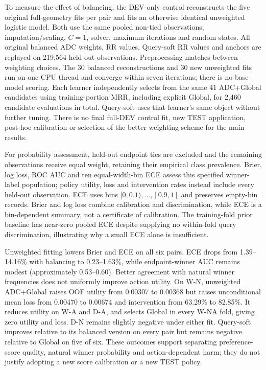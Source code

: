 \documentclass[11pt,a4paper]{article}
\begin{document}
To measure the effect of balancing, the DEV-only control reconstructs the five original full-geometry fits per pair and fits an otherwise identical unweighted logistic model. Both use the same pooled non-tied observations, imputation/scaling, $C=1$, solver, maximum iterations and random states. All original balanced ADC weights, RR values, Query-soft RR values and anchors are replayed on 219,564 held-out observations. Preprocessing matches between weighting choices. The 30 balanced reconstructions and 30 new unweighted fits run on one CPU thread and converge within seven iterations; there is no base-model scoring. Each learner independently selects from the same 41 ADC+Global candidates using training-portion MRR, including explicit Global, for 2,460 candidate evaluations in total. Query-soft uses that learner's same object without further tuning. There is no final full-DEV control fit, new TEST application, post-hoc calibration or selection of the better weighting scheme for the main results.



For probability assessment, held-out endpoint ties are excluded and the remaining observations receive equal weight, retaining their empirical class prevalence. Brier, log loss, ROC AUC and ten equal-width-bin ECE assess this specified winner-label population; policy utility, loss and intervention rates instead include every held-out observation. ECE uses bins $[0,0.1),\ldots,[0.9,1]$ and preserves empty-bin records. Brier and log loss combine calibration and discrimination, while ECE is a bin-dependent summary, not a certificate of calibration. The training-fold prior baseline has near-zero pooled ECE despite supplying no within-fold query discrimination, illustrating why a small ECE alone is insufficient.

Unweighted fitting lowers Brier and ECE on all six pairs. ECE drops from 1.39--14.16\% with balancing to 0.23--1.63\%, while endpoint-winner AUC remains modest (approximately 0.53--0.60). Better agreement with natural winner frequencies does not uniformly improve action utility. On W-N, unweighted ADC+Global raises OOF utility from 0.00307 to 0.00368 but raises unconditional mean loss from 0.00470 to 0.00674 and intervention from 63.29\% to 82.85\%. It reduces utility on W-A and D-A, and selects Global in every W-NA fold, giving zero utility and loss. D-N remains slightly negative under either fit. Query-soft improves relative to its balanced version on every pair but remains negative relative to Global on five of six. These outcomes support separating preference-score quality, natural winner probability and action-dependent harm; they do not justify adopting a new score calibration or a new TEST policy.
\end{document}
